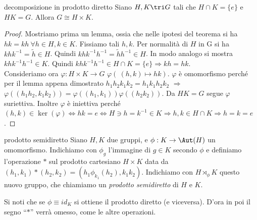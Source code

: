 \begin{theorem}{decomposizione in prodotto diretto}
    Siano $H,K \tri G$ tali che $H \cap K = \{e\}$ e $HK = G$. Allora $G \cong H \times K$.
\end{theorem}
\begin{proof}
    Mostriamo prima un lemma, ossia che nelle ipotesi del teorema si ha $hk = kh \ \forall h\in H, k \in K$. Fissiamo tali $h,k$. Per normalità di $H$ in G si ha $khk^{-1} = \tilde h \in H$. Quindi $khk^{-1}h^{-1} = \tilde h h^{-1} \in H$. In modo analogo si mostra  $khk^{-1}h^{-1} \in K$. Quindi $khk^{-1}h^{-1} \in H \cap K = \{ e\} \Rightarrow kh= hk$. \\Consideriamo ora $\varphi: H \times K \to G$ $\varphi(\ (h,k) \mapsto hk)$. $\varphi$ è omomorfismo perché per il lemma appena dimostrato $h_1h_2k_1k_2 =  h_1k_1h_2k_2$ $\Rightarrow$ $\varphi((h_1h_2, k_1k_2)) =\varphi((h_1, k_1)) \varphi((h_2k_2))$.  Da $HK = G$ segue $\varphi$ suriettiva. Inoltre $\varphi$ è iniettiva perché $(h,k) \in \ker(\varphi) \iff hk = e \iff H \ni h = k^{-1} \in K \Rightarrow h,k \in H\cap K \Rightarrow h=k=e$.
\end{proof}
\begin{definition}{prodotto semidiretto}
    Siano $H, K$ due gruppi, e $\phi: K \rightarrow \Aut(H)$ un omomorfismo. Indichiamo con $\phi_g$ l'immagine di $g\in K$ secondo $\phi$ e definiamo l'operazione $*$ sul prodotto cartesiano $H \times K$ data da $(h_1,k_1)*(h_2,k_2) = (h_1\phi_{k_1}(h_2), k_1k_2)$. Indichiamo con $H \rtimes_{\phi} K$ questo nuovo gruppo, che chiamiamo un \textit{prodotto semidiretto} di $H$ e $K$.
\end{definition}

Si noti che se $\phi \equiv id_{K}$ si ottiene il prodotto diretto (e viceversa). D'ora in poi il segno ``$*$'' verrà omesso, come le altre operazioni.

